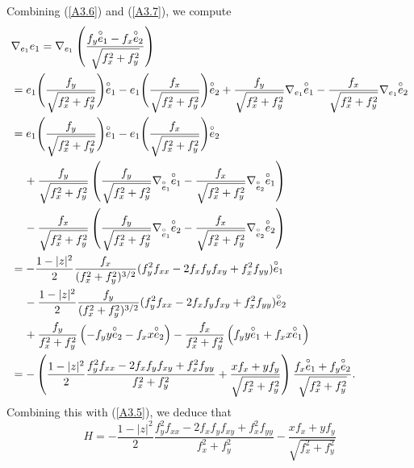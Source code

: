 \documentclass{amsart}
\theoremstyle{Corollary}
\numberwithin{equation}{section}
\begin{document}
Combining (\ref{A3.6}) and (\ref{A3.7}), we compute 
\begin{align*}
&\nabla_{e_1}e_1
=\nabla_{e_1}\left(\frac{f_y\overset{\circ}{e}_1-f_x\overset{\circ}{e}_2}{\sqrt{f_x^2+f_y^2}}\right)\\
&=e_1\Bigg(\frac{f_y}{\sqrt{f_x^2+f_y^2}}\Bigg)\overset{\circ}{e}_1-e_1\Bigg(\frac{f_x}{\sqrt{f_x^2+f_y^2}}\Bigg)\overset{\circ}{e}_2
+\frac{f_y}{\sqrt{f_x^2+f_y^2}}\nabla_{e_1}\overset{\circ}{e}_1
-\frac{f_x}{\sqrt{f_x^2+f_y^2}}\nabla_{e_1}\overset{\circ}{e}_2\\
&=e_1\Bigg(\frac{f_y}{\sqrt{f_x^2+f_y^2}}\Bigg)\overset{\circ}{e}_1-e_1\Bigg(\frac{f_x}{\sqrt{f_x^2+f_y^2}}\Bigg)\overset{\circ}{e}_2\\
&\hspace{4mm}+\frac{f_y}{\sqrt{f_x^2+f_y^2}}\left(\frac{f_y}{\sqrt{f_x^2+f_y^2}}\nabla_{\overset{\circ}{e}_1}\overset{\circ}{e}_1
-\frac{f_x}{\sqrt{f_x^2+f_y^2}}\nabla_{\overset{\circ}{e}_2}\overset{\circ}{e}_1\right)\\
&\hspace{4mm}
-\frac{f_x}{\sqrt{f_x^2+f_y^2}}\left(\frac{f_y}{\sqrt{f_x^2+f_y^2}}\nabla_{\overset{\circ}{e}_1}\overset{\circ}{e}_2
-\frac{f_x}{\sqrt{f_x^2+f_y^2}}\nabla_{\overset{\circ}{e}_2}\overset{\circ}{e}_2\right)\\
&=-\frac{1-|z|^2}{2}\frac{f_x}{(f_x^2+f_y^2)^{3/2}}(f_y^2f_{xx}-2f_xf_y f_{xy}+f_x^2 f_{yy})\overset{\circ}{e}_1\\
&\hspace{4mm}
-\frac{1-|z|^2}{2}\frac{f_y}{(f_x^2+f_y^2)^{3/2}}(f_y^2f_{xx}-2f_xf_y f_{xy}+f_x^2 f_{yy})\overset{\circ}{e}_2\\
&\hspace{4mm}
+\frac{f_y}{ f_x^2+f_y^2}\left(- f_y y\overset{\circ}{e}_2
- f_x x\overset{\circ}{e}_2\right) 
-\frac{f_x}{ f_x^2+f_y^2 }\left( f_y y\overset{\circ}{e}_1
+ f_x x\overset{\circ}{e}_1\right)\\
&=-\left(\frac{1-|z|^2}{2}\frac{f_y^2f_{xx}-2f_xf_y f_{xy}+f_x^2f_{yy}}{f_x^2+f_y^2} +\frac{xf_x+yf_y}{\sqrt{f_x^2+f_y^2}}\right)\frac{f_x\overset{\circ}{e}_1+f_y\overset{\circ}{e}_2}{\sqrt{f_x^2+f_y^2}}.
\end{align*}
Combining this with (\ref{A3.5}), we deduce that 
\begin{equation}\label{A3.8}
H=-\frac{1-|z|^2}{2}\frac{f_y^2f_{xx}-2f_xf_y f_{xy}+f_x^2f_{yy}}{f_x^2+f_y^2}-\frac{xf_x+yf_y}{\sqrt{f_x^2+f_y^2}}
\end{equation}
\end{document}
